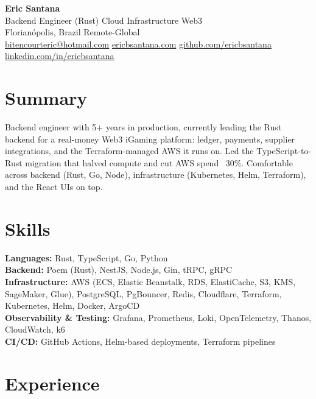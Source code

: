 \documentclass[10pt,letterpaper]{article}
\begin{document}
\begin{center}
  {\LARGE\bfseries Eric Santana}\\
  Backend Engineer (Rust) \textbar{} Cloud Infrastructure \textbar{} Web3\\
  Florian\'opolis, Brazil \textbar{} Remote-Global\\
  \href{mailto:bitencourteric@hotmail.com}{bitencourteric@hotmail.com} \textbar{}
  \href{https://www.ericbsantana.com}{ericbsantana.com} \textbar{}
  \href{https://github.com/ericbsantana}{github.com/ericbsantana} \textbar{}
  \href{https://www.linkedin.com/in/ericbsantana}{linkedin.com/in/ericbsantana}
\end{center}

\section*{Summary}
Backend engineer with 5+ years in production, currently leading the Rust backend for a real-money Web3 iGaming platform: ledger, payments, supplier integrations, and the Terraform-managed AWS it runs on. Led the TypeScript-to-Rust migration that halved compute and cut AWS spend ~30\%. Comfortable across backend (Rust, Go, Node), infrastructure (Kubernetes, Helm, Terraform), and the React UIs on top.

\section*{Skills}
\noindent\textbf{Languages:} Rust, TypeScript, Go, Python\\
\textbf{Backend:} Poem (Rust), NestJS, Node.js, Gin, tRPC, gRPC\\
\textbf{Infrastructure:} AWS (ECS, Elastic Beanstalk, RDS, ElastiCache, S3, KMS, SageMaker, Glue), PostgreSQL, PgBouncer, Redis, Cloudflare, Terraform, Kubernetes, Helm, Docker, ArgoCD\\
\textbf{Observability \& Testing:} Grafana, Prometheus, Loki, OpenTelemetry, Thanos, CloudWatch, k6\\
\textbf{CI/CD:} GitHub Actions, Helm-based deployments, Terraform pipelines

\section*{Experience}
\end{document}
